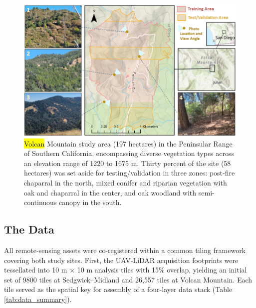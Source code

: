 \documentclass[remotesensing,article,accept,pdftex,moreauthors]{Definitions/mdpi}
\begin{document}
\begin{figure}[H]

    \includegraphics[width=0.98\linewidth]{figures/Volcan_Mtn_Study_Area.png}
    \caption{\hl{Volcan} %
 Mountain study area (197 hectares) in the Peninsular Range of Southern California, encompassing diverse vegetation types across an elevation range of 1220 to 1675 m. Thirty percent of the site (58 hectares) was set aside for testing/validation in three zones: post-fire chaparral in the north, mixed conifer and riparian vegetation with oak and chaparral in the center, and oak woodland with semi-continuous canopy in the south. }
    \label{fig:volcan_mtn_study_area}
\end{figure}






\subsection{The Data}

All remote‐sensing assets were co-registered within a common tiling framework covering both study sites.   First, the UAV‐LiDAR acquisition footprints were tessellated into 10 m × 10 m analysis tiles with 15\% overlap, yielding an initial set of 9800 tiles at Sedgwick–Midland and 26,557 tiles at Volcan Mountain. Each tile served as the spatial key for assembly of a four-layer data stack (Table \ref{tab:data_summary}).

\end{document}
